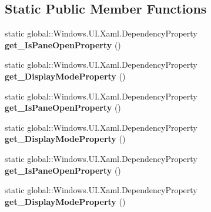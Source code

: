 \subsection*{Static Public Member Functions}
\begin{DoxyCompactItemize}
\item 
\mbox{\label{class_windows_1_1_u_i_1_1_xaml_1_1_controls_1_1_split_view_a693e5e0c6ca34b729d739f0481248cfd}} 
static global\+::\+Windows.\+U\+I.\+Xaml.\+Dependency\+Property {\bfseries get\+\_\+\+Is\+Pane\+Open\+Property} ()
\item 
\mbox{\label{class_windows_1_1_u_i_1_1_xaml_1_1_controls_1_1_split_view_aa77525b24678b9fbd2af29bb195bf269}} 
static global\+::\+Windows.\+U\+I.\+Xaml.\+Dependency\+Property {\bfseries get\+\_\+\+Display\+Mode\+Property} ()
\item 
\mbox{\label{class_windows_1_1_u_i_1_1_xaml_1_1_controls_1_1_split_view_a693e5e0c6ca34b729d739f0481248cfd}} 
static global\+::\+Windows.\+U\+I.\+Xaml.\+Dependency\+Property {\bfseries get\+\_\+\+Is\+Pane\+Open\+Property} ()
\item 
\mbox{\label{class_windows_1_1_u_i_1_1_xaml_1_1_controls_1_1_split_view_aa77525b24678b9fbd2af29bb195bf269}} 
static global\+::\+Windows.\+U\+I.\+Xaml.\+Dependency\+Property {\bfseries get\+\_\+\+Display\+Mode\+Property} ()
\item 
\mbox{\label{class_windows_1_1_u_i_1_1_xaml_1_1_controls_1_1_split_view_a693e5e0c6ca34b729d739f0481248cfd}} 
static global\+::\+Windows.\+U\+I.\+Xaml.\+Dependency\+Property {\bfseries get\+\_\+\+Is\+Pane\+Open\+Property} ()
\item 
\mbox{\label{class_windows_1_1_u_i_1_1_xaml_1_1_controls_1_1_split_view_aa77525b24678b9fbd2af29bb195bf269}} 
static global\+::\+Windows.\+U\+I.\+Xaml.\+Dependency\+Property {\bfseries get\+\_\+\+Display\+Mode\+Property} ()
\item 
\mbox{\label{class_windows_1_1_u_i_1_1_xaml_1_1_controls_1_1_split_view_a693e5e0c6ca34b729d739f0481248cfd}} 

\end{DoxyCompactItemize}
